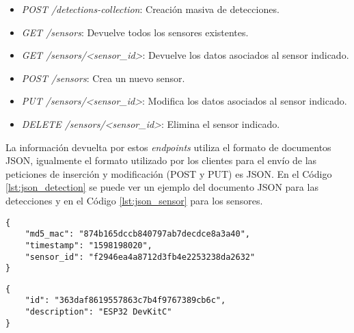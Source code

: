 \documentclass[../proyecto.tex]{subfiles}
\begin{document}

\begin{itemize}
\item \textit{POST /detections-collection}: Creación masiva de detecciones.
\end{itemize}


\begin{itemize}
  \item \textit{GET /sensors}: Devuelve todos los sensores existentes.
  \item \textit{GET /sensors/<sensor\_id>}: Devuelve los datos asociados al sensor indicado.
  \item \textit{POST /sensors}: Crea un nuevo sensor.
  \item \textit{PUT /sensors/<sensor\_id>}: Modifica los datos asociados al sensor indicado.
  \item \textit{DELETE /sensors/<sensor\_id>}: Elimina el sensor indicado.
\end{itemize}

La información devuelta por estos \textit{endpoints} utiliza el formato de documentos JSON, igualmente el formato utilizado por los clientes para el envío de las peticiones de inserción y modificación (POST y PUT) es JSON. En el Código \ref{lst:json_detection} se puede ver un ejemplo del documento JSON para las detecciones y en el Código \ref{lst:json_sensor} para los sensores.\\

\begin{minipage}{\linewidth}
\begin{lstlisting}[caption=Ejemplo de JSON para detecciones, label={lst:json_detection}, captionpos=b, frame=single]
{
    "md5_mac": "874b165dccb840797ab7decdce8a3a40",
    "timestamp": "1598198020",
    "sensor_id": "f2946ea4a8712d3fb4e2253238da2632"
}
\end{lstlisting}
\end{minipage}

\begin{minipage}{\linewidth}
\begin{lstlisting}[caption=Ejemplo de JSON para sensores, label={lst:json_sensor}, captionpos=b, frame=single]
{
    "id": "363daf8619557863c7b4f9767389cb6c",
    "description": "ESP32 DevKitC"
}
\end{lstlisting}
\end{minipage}
\end{document}
